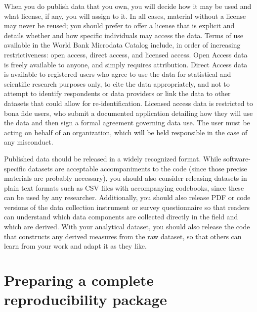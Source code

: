 When you do publish data that you own,
you will decide how it may be used and what license,
if any, you will assign to it.
In all cases, material without a license may never be reused;
you should prefer to offer a license that is explicit
and details whether and how specific individuals may access the data.
Terms of use available in the World Bank Microdata Catalog include,
in order of increasing restrictiveness:
open access, direct access, and licensed access.
Open Access data is freely available to anyone, and simply requires attribution.
Direct Access data is available to registered users who agree
to use the data for statistical and scientific research purposes only,
to cite the data appropriately,
and not to attempt to identify respondents or data providers
or link the data to other datasets that could allow for re-identification.
Licensed access data is restricted to bona fide users,
who submit a documented application detailing
how they will use the data and then sign a formal agreement governing data use.
The user must be acting on behalf of an organization,
which will be held responsible in the case of any misconduct.

Published data should be released in a widely recognized format.
While software-specific datasets are acceptable accompaniments to the code
(since those precise materials are probably necessary),
you should also consider releasing datasets in plain text formats
such as CSV files with accompanying codebooks,
since these can be used by any researcher.
Additionally, you should also release PDF or code versions of
the data collection instrument or survey questionnaire
so that readers can understand which data components are
collected directly in the field and which are derived.
With your analytical dataset,
you should also release the code
that constructs any derived measures
from the raw dataset,
so that others can learn from your work and adapt it as they like.

\section{Preparing a complete reproducibility package}


